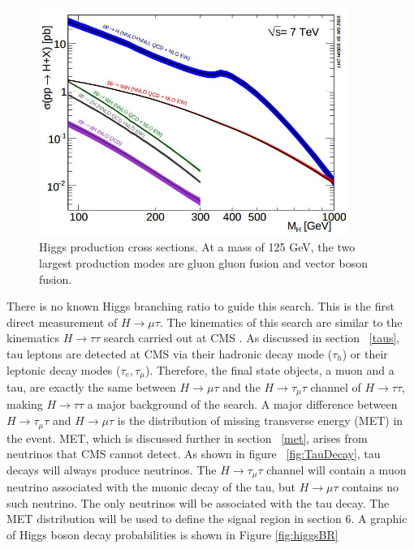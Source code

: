 \documentclass[oneside, letterpaper, oldfontcommands]{memoir}
\begin{document}
\begin{figure}[here]
\includegraphics[width=0.9\textwidth]{higgsproduction.jpg}
\caption{Higgs production cross sections\cite{Dittmaier:2011ti}. At a mass of 125 GeV, the two largest production modes are gluon gluon fusion and vector boson fusion.}
\label{fig:higgsproduction}
\end{figure}

\qquad There is no known Higgs branching ratio to guide this search. This is the first direct measurement of $H \rightarrow \mu \tau$. The kinematics of this search are similar to the kinematics $H \rightarrow \tau\tau$ search carried out at CMS \cite{Chatrchyan:2012xdj}. As discussed in section ~\ref{taus}, tau leptons are detected at CMS via their hadronic decay mode ($\tau_{h}$) or their leptonic decay modes ($\tau_{e}, \tau_{\mu}$). Therefore, the final state objects, a muon and a tau, are exactly the same between $H \rightarrow \mu \tau$ and the $H \rightarrow \tau_{\mu} \tau$ channel of $H \rightarrow \tau\tau$, making $H \rightarrow \tau\tau$ a major background of the search. A major difference between $H \rightarrow \tau_{\mu} \tau$ and $H \rightarrow \mu \tau$ is the distribution of missing transverse energy (MET) in the event. MET, which is discussed further in section ~\ref{met}, arises from neutrinos that CMS cannot detect. As shown in figure ~\ref{fig:TauDecay}, tau decays will always produce neutrinos. The $H \rightarrow \tau_{\mu} \tau$ channel will contain a muon neutrino associated with the muonic decay of the tau, but $H \rightarrow \mu \tau$ contains no such neutrino. The only neutrinos will be associated with the tau decay. The MET distribution will be used to define the signal region in section 6. A graphic of Higgs boson decay probabilities is shown in Figure \ref{fig:higgsBR}\cite{Heinemeyer:2013tqa}
\end{document}
